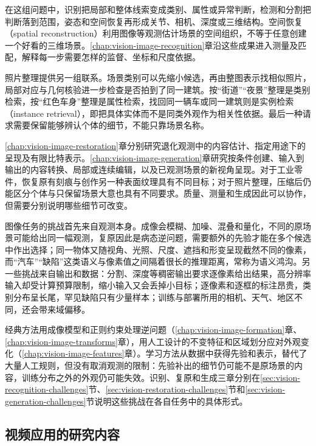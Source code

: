 在这组问题中，识别把局部和整体线索变成类别、属性或异常判断，检测和分割把判断落到范围，姿态和空间恢复再形成关节、相机、深度或三维结构。空间恢复（spatial reconstruction）利用图像等观测估计场景的空间组织，不等于任意创建一个好看的三维场景。\ref{chap:vision-image-recognition}章沿这些成果进入测量及匹配，解释每一步需要怎样的监督、坐标和尺度依据。

照片整理提供另一组联系。场景类别可以先缩小候选，再由整图表示找相似照片，局部对应与几何核验进一步检查是否拍到了同一建筑。按“街道”“夜景”整理是类别检索，按“红色车身”整理是属性检索，找回同一辆车或同一建筑则是实例检索（instance retrieval），即把具体实体而不是同类外观作为相关性依据。最后一种请求需要保留能够辨认个体的细节，不能只靠场景名称。

\ref{chap:vision-image-restoration}章分别研究退化观测中的内容估计、指定用途下的呈现及有限比特表示。\ref{chap:vision-image-generation}章研究按条件创建、输入到输出的内容转换、局部或连续编辑，以及已观测场景的新视角呈现。对于工业零件，恢复原有刻痕与创作另一种表面纹理具有不同目标；对于照片整理，压缩后仍能区分个体与只保留场景大意也具有不同要求。质量、测量和生成因此可以协作，但需要分别说明哪些细节可改变。

图像任务的挑战首先来自观测本身。成像会模糊、加噪、混叠和量化，不同的原场景可能给出同一幅观测，复原因此是病态逆问题，需要额外的先验才能在多个候选中作出选择；同一物体又随视角、光照、尺度、遮挡和形变呈现截然不同的像素，而“汽车”“缺陷”这类语义与像素值之间隔着很长的推理距离，常称为语义鸿沟。另一些挑战来自输出和数据：分割、深度等稠密输出要求逐像素给出结果，高分辨率输入却受计算预算限制，缩小输入又会丢掉小目标；逐像素和逐框的标注昂贵，类别分布呈长尾，罕见缺陷只有少量样本；训练与部署所用的相机、天气、地区不同，还会带来域偏移。

经典方法用成像模型和正则约束处理逆问题（\ref{chap:vision-image-formation}章、\ref{chap:vision-image-transforms}章），用人工设计的不变特征和区域划分应对外观变化（\ref{chap:vision-image-features}章）。学习方法从数据中获得先验和表示，替代了大量人工规则，但没有取消观测的限制：先验补出的细节仍可能不是原场景的内容，训练分布之外的外观仍可能失效。识别、复原和生成三章分别在\ref{sec:vision-recognition-challenges}节、\ref{sec:vision-restoration-challenges}节和\ref{sec:vision-generation-challenges}节说明这些挑战在各自任务中的具体形式。

\subsection{视频应用的研究内容}
\label{sec:vision-overview-video-tasks}


